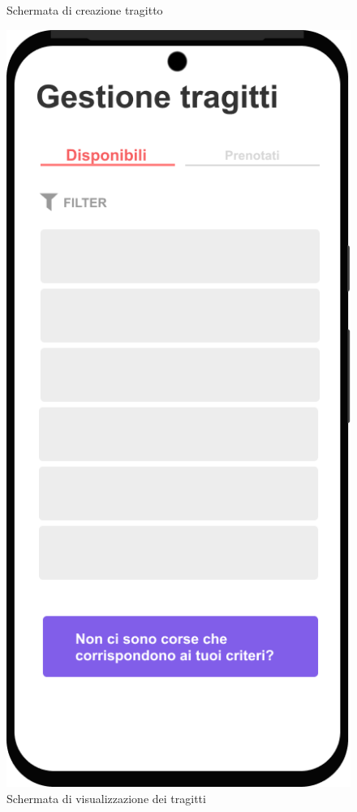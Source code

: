 \begin{figure}[H]
\begin{minipage}{0.45\textwidth}
        \caption{Schermata di creazione tragitto}
        \label{mockUp:createTrip}
    \end{minipage}%
    \hfill
    \begin{minipage}{0.45\textwidth}
        \centering
        \includegraphics[width=\linewidth]{Images/Tragitti disponibili.png}
        \caption{Schermata di visualizzazione dei tragitti}
        \label{mockUp:viewTrips}
    \end{minipage}
\end{figure}

